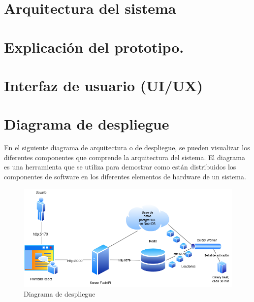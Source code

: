 \section{Arquitectura del sistema}



\newpage
\section{Explicación del prototipo.}



\section{Interfaz de usuario (UI/UX)}



\newpage
\section{Diagrama de despliegue}

En el siguiente diagrama de arquitectura o de despliegue, se pueden visualizar los diferentes componentes que comprende la arquitectura del sistema. El diagrama es una herramienta que se utiliza para demostrar como están distribuidos los componentes de software en los diferentes elementos de hardware de un sistema.

\begin{figure}[H]
  \centering
  \includegraphics[width=0.9\linewidth]{Imagenes/Diagrama de despliegue.png}
  \caption{Diagrama de despliegue}
  \label{fig:ER}
\end{figure}